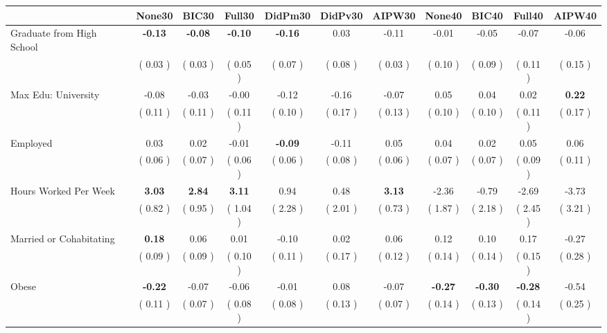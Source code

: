 \begin{tabular}{l c c c c c c c c c c}
\toprule
 & None30 & BIC30 & Full30 & DidPm30 & DidPv30 & AIPW30 & None40 & BIC40 & Full40 & AIPW40 \\
\midrule
Graduate from High School & \textbf{     -0.13 } & \textbf{     -0.08 } & \textbf{     -0.10 } & \textbf{     -0.16 } &      0.03 &     -0.11 &     -0.01 &     -0.05 &     -0.07 &     -0.06 \\
& (     0.03 ) & (     0.03 ) & (     0.05 ) & (     0.07 ) & (     0.08 ) & (     0.03 ) & (     0.10 ) & (     0.09 ) & (     0.11 ) & (     0.15 ) \\
Max Edu: University &     -0.08 &     -0.03 &     -0.00 &     -0.12 &     -0.16 &     -0.07 &      0.05 &      0.04 &      0.02 & \textbf{     0.22} \\
& (     0.11 ) & (     0.11 ) & (     0.11 ) & (     0.10 ) & (     0.17 ) & (     0.13 ) & (     0.10 ) & (     0.10 ) & (     0.11 ) & (     0.17 ) \\
Employed &      0.03 &      0.02 &     -0.01 & \textbf{     -0.09 } &     -0.11 &      0.05 &      0.04 &      0.02 &      0.05 &      0.06 \\
& (     0.06 ) & (     0.07 ) & (     0.06 ) & (     0.06 ) & (     0.08 ) & (     0.06 ) & (     0.07 ) & (     0.07 ) & (     0.09 ) & (     0.11 ) \\
Hours Worked Per Week & \textbf{      3.03 } & \textbf{      2.84 } & \textbf{      3.11 } &      0.94 &      0.48 & \textbf{     3.13} &     -2.36 &     -0.79 &     -2.69 &     -3.73 \\
& (     0.82 ) & (     0.95 ) & (     1.04 ) & (     2.28 ) & (     2.01 ) & (     0.73 ) & (     1.87 ) & (     2.18 ) & (     2.45 ) & (     3.21 ) \\
Married or Cohabitating & \textbf{      0.18 } &      0.06 &      0.01 &     -0.10 &      0.02 &      0.06 &      0.12 &      0.10 &      0.17 &     -0.27 \\
& (     0.09 ) & (     0.09 ) & (     0.10 ) & (     0.11 ) & (     0.17 ) & (     0.12 ) & (     0.14 ) & (     0.14 ) & (     0.15 ) & (     0.28 ) \\
Obese & \textbf{     -0.22 } &     -0.07 &     -0.06 &     -0.01 &      0.08 &     -0.07 & \textbf{     -0.27 } & \textbf{     -0.30 } & \textbf{     -0.28 } &     -0.54 \\
& (     0.11 ) & (     0.07 ) & (     0.08 ) & (     0.08 ) & (     0.13 ) & (     0.07 ) & (     0.14 ) & (     0.13 ) & (     0.14 ) & (     0.25 ) \\

\end{tabular}
